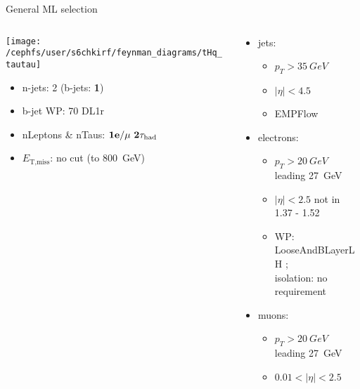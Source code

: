 \begin{frame}{General ML selection}
  \begin{columns}
    \begin{column}{0.5\textwidth}
      \centering \texttt{[image: /cephfs/user/s6chkirf/feynman\_diagrams/tHq\_tautau]}\\
      \begin{itemize}
        \item n-jets: 2 (b-jets: \textbf{1})
        \item b-jet WP: 70 DL1r
        \item nLeptons \& nTaus: $\bf{1e / \mu~2\tau_{\text{had}}} $
        \item $E_{\text{T,miss}}$: no cut (to \SI{800}{GeV})
      \end{itemize}
    \end{column}
    \begin{column}{0.7\textwidth}
      \vspace*{-0.05\textwidth}
      \begin{itemize}
        \footnotesize
        \item jets:
        \vspace*{-0.02\textwidth}
        \begin{itemize}
          \footnotesize
          \item $p_T>\SI{35}{GeV}$
          \item $|\eta|<4.5$
          \item EMPFlow
        \end{itemize}
        \item electrons:
        \vspace*{-0.02\textwidth}
        \begin{itemize}
          \footnotesize
          \item $p_T>\SI{20}{GeV}$ leading \SI{27}{GeV}
          \item $|\eta|<2.5$ not in 1.37 - 1.52
          \item WP: LooseAndBLayerLH ; \\isolation: no requirement
        \end{itemize}
        \item muons:
        \vspace*{-0.02\textwidth}
        \begin{itemize}
          \footnotesize
          \item $p_T>\SI{20}{GeV}$ leading \SI{27}{GeV}
          \item $0.01<|\eta|<2.5$

\end{itemize}
\end{itemize}
\end{column}
\end{columns}
\end{frame}
